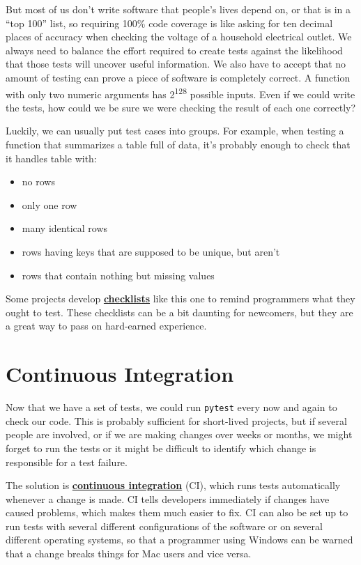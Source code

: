 \documentclass[
]{krantz}
\providecommand{\tightlist}{%
  \setlength{\itemsep}{0pt}\setlength{\parskip}{0pt}}
\newcommand{\gref}[2]{\hyperlink{#2}{\textbf{#1}}}
\begin{document}
But most of us don't write software that people's lives depend on,
or that is in a ``top 100'' list,
so requiring 100\% code coverage is like asking for ten decimal places of accuracy
when checking the voltage of a household electrical outlet.
We always need to balance the effort required to create tests
against the likelihood that those tests will uncover useful information.
We also have to accept that no amount of testing
can prove a piece of software is completely correct.
A function with only two numeric arguments has 2\textsuperscript{128} possible inputs.
Even if we could write the tests,
how could we be sure we were checking the result of each one correctly?

Luckily,
we can usually put test cases into groups.
For example,
when testing a function that summarizes a table full of data,
it's probably enough to check that it handles table with:

\begin{itemize}
\tightlist
\item
  no rows
\item
  only one row
\item
  many identical rows
\item
  rows having keys that are supposed to be unique, but aren't
\item
  rows that contain nothing but missing values
\end{itemize}

Some projects develop \gref{checklists}{checklist} like this one
to remind programmers what they ought to test.
These checklists can be a bit daunting for newcomers,
but they are a great way to pass on hard-earned experience.

\hypertarget{testing-ci}{%
\section{Continuous Integration}\label{testing-ci}}

Now that we have a set of tests,
we could run \texttt{pytest} every now and again to check our code.
This is probably sufficient for short-lived projects,
but if several people are involved,
or if we are making changes over weeks or months,
we might forget to run the tests
or it might be difficult to identify which change is responsible for a test failure.

The solution is \gref{continuous integration}{continuous\_integration} (CI),
which runs tests automatically whenever a change is made.
CI tells developers immediately if changes have caused problems,
which makes them much easier to fix.
CI can also be set up to run tests with several different configurations of the software
or on several different operating systems,
so that a programmer using Windows
can be warned that a change breaks things for Mac users and vice versa.
\end{document}
